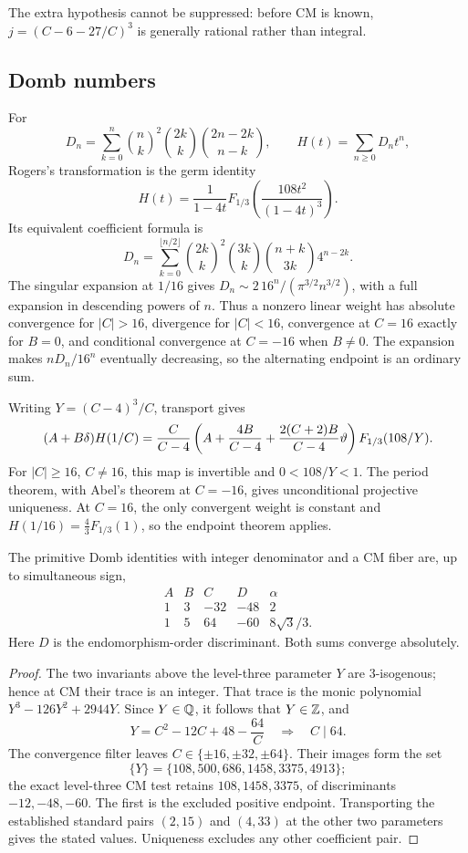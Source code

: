 The extra hypothesis cannot be suppressed: before CM is known,
$j=(C-6-27/C)^3$ is generally rational rather than integral.

\subsection{Domb numbers}\label{sec:domb}
For
\[
 D_n=\sum_{k=0}^n\binom nk^2\binom{2k}k\binom{2n-2k}{n-k},
 \qquad H(t)=\sum_{n\ge0}D_nt^n,
\]
Rogers's transformation \cite{RogersDomb} is the germ identity
\begin{equation}\label{eq:domb-pullback}
 H(t)=\frac1{1-4t}F_{1/3}\!\left(\frac{108t^2}{(1-4t)^3}\right).
\end{equation}
Its equivalent coefficient formula is
\[
 D_n=\sum_{k=0}^{\lfloor n/2\rfloor}
   \binom{2k}k^2\binom{3k}k\binom{n+k}{3k}4^{n-2k}.
\]
The singular expansion at $1/16$ gives
$D_n\sim2\,16^n/(\pi^{3/2}n^{3/2})$, with a full expansion in
descending powers of $n$. Thus a nonzero linear weight has absolute
convergence for $|C|>16$, divergence for $|C|<16$, convergence at
$C=16$ exactly for $B=0$, and conditional convergence at $C=-16$
when $B\ne0$. The expansion makes $nD_n/16^n$ eventually decreasing,
so the alternating endpoint is an ordinary sum.

Writing $Y=(C-4)^3/C$, transport gives
\begin{equation}\label{eq:domb-weights}
 (A+B\delta)H(1/C)=\frac{C}{C-4}
 \left(A+\frac{4B}{C-4}
       +\frac{2(C+2)B}{C-4}\vartheta\right)F_{1/3}(108/Y).
\end{equation}
For $|C|\ge16$, $C\ne16$, this map is invertible and $0<108/Y<1$.
The period theorem, with Abel's theorem at $C=-16$, gives unconditional
projective uniqueness. At $C=16$, the only convergent weight is constant
and $H(1/16)=\tfrac43F_{1/3}(1)$, so the endpoint theorem applies.

\begin{proposition}\label{prop:domb-CM}
The primitive Domb identities with integer denominator and a CM fiber
are, up to simultaneous sign,
\[
\begin{array}{rrr|r|l}
 A&B&C&D&\alpha\\\hline
 1&3&-32&-48&2\\
 1&5&64&-60&8\sqrt3/3.
\end{array}
\]
Here $D$ is the endomorphism-order discriminant. Both sums converge
absolutely.
\end{proposition}
\begin{proof}
The two invariants above the level-three parameter $Y$ are
$3$-isogenous; hence at CM their trace is an integer. That trace is
the monic polynomial $Y^3-126Y^2+2944Y$. Since $Y\in\mathbb Q$, it follows
that $Y\in\mathbb Z$, and
\[
 Y=C^2-12C+48-\frac{64}C
 \quad\Longrightarrow\quad C\mid64.
\]
The convergence filter leaves $C\in\{\pm16,\pm32,\pm64\}$.
Their images form the set
\[
 \{Y\}=\{108,500,686,1458,3375,4913\};
\]
the exact level-three CM test retains $108,1458,3375$, of discriminants
$-12,-48,-60$. The first is the excluded positive endpoint.
Transporting the established standard pairs $(2,15)$ and $(4,33)$
at the other two parameters gives the stated values. Uniqueness
excludes any other coefficient pair.
\end{proof}


